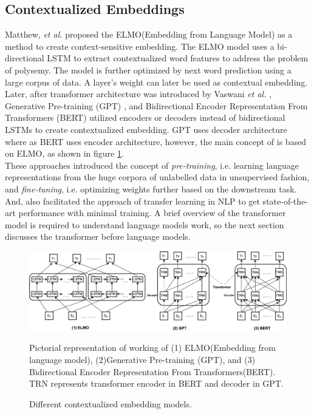 \documentclass[%
	BCOR=8mm, %
	DIV=12,
	toc=bibliography, %
	toc=listof, %
	oneside, %
	egregdoesnotlikesansseriftitles, %
	]{scrbook}
\begin{document}
 \subsection{Contextualized Embeddings}
 \label{subsection:contextembeddings}
 Matthew, \textit{et al.} \cite{peters_deep_2018-3} proposed the ELMO(Embedding from Language Model) as a method to create context-sensitive embedding. The ELMO model uses a bi-directional LSTM to extract contextualized word features to address the problem of polysemy. The model is further optimized by next word prediction using a large corpus of data. A layer's weight can later be used as contextual embedding. \\
 Later, after transformer architecture was introduced by  Vaswani \textit{et al.} \cite{vaswani_attention_2017}, Generative Pre-training (GPT) \cite{radford_improving_nodate}, and Bidirectional Encoder Representation From Transformers (BERT) \cite{devlin_bert_2019-1} utilized  encoders or decoders instead of bidirectional LSTMs to create contextualized embedding. GPT uses decoder architecture where as BERT uses encoder architecture, however, the main concept of is based on ELMO, as shown in figure \ref{fig:elmo}. \\
These approaches introduced the concept of \textit{pre-training}, i.e. learning language representations from the huge corpora of unlabelled data in unsupervised fashion, and \textit{fine-tuning}, i.e. optimizing weights further based on the downstream task. And, also facilitated the approach of transfer learning in NLP to get state-of-the-art performance with minimal training. A brief overview of the transformer model is required to understand language models work, so the next section discusses the transformer before language models.

\begin{figure}[h!]
    \centering
    \includegraphics[width=1.0\linewidth]{img/elmo}
    \caption{Different contextualized embedding models.}{Pictorial representation of working of (1) ELMO(Embedding from language model),  (2)Generative Pre-training (GPT), and (3) Bidirectional Encoder Representation From Transformers(BERT). TRN represents transformer encoder in BERT and decoder in GPT.}
    \label{fig:elmo}
\end{figure}
\end{document}
